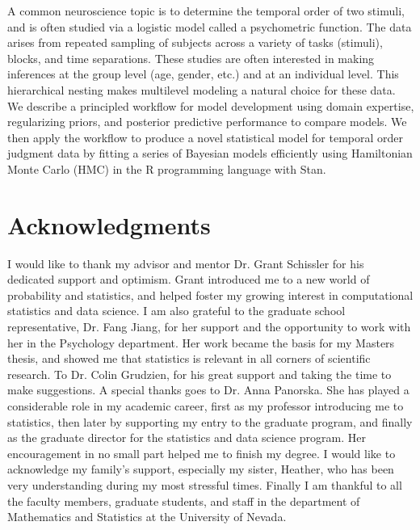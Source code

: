 A common neuroscience topic is to determine the temporal order of two stimuli, and is often studied via a logistic model called a psychometric function. The data arises from repeated sampling of subjects across a variety of tasks (stimuli), blocks, and time separations. These studies are often interested in making inferences at the group level (age, gender, etc.) and at an individual level. This hierarchical nesting makes multilevel modeling a natural choice for these data. We describe a principled workflow for model development using domain expertise, regularizing priors, and posterior predictive performance to compare models. We then apply the workflow to produce a novel statistical model for temporal order judgment data by fitting a series of Bayesian models efficiently using Hamiltonian Monte Carlo (HMC) in the R programming language with Stan.


\newpage
\section*{Acknowledgments}

I would like to thank my advisor and mentor Dr. Grant Schissler for his dedicated support and optimism. Grant introduced me to a new world of probability and statistics, and helped foster my growing interest in computational statistics and data science. I am also grateful to the graduate school representative, Dr. Fang Jiang, for her support and the opportunity to work with her in the Psychology department. Her work became the basis for my Masters thesis, and showed me that statistics is relevant in all corners of scientific research. To Dr. Colin Grudzien, for his great support and taking the time to make suggestions. A special thanks goes to Dr. Anna Panorska. She has played a considerable role in my academic career, first as my professor introducing me to statistics, then later by supporting my entry to the graduate program, and finally as the graduate director for the statistics and data science program. Her encouragement in no small part helped me to finish my degree. I would like to acknowledge my family's support, especially my sister, Heather, who has been very understanding during my most stressful times. Finally I am thankful to all the faculty members, graduate students, and staff in the department of Mathematics and Statistics at the University of Nevada.


\setcounter{tocdepth}{1}
\tableofcontents

\listoftables

\listoffigures
